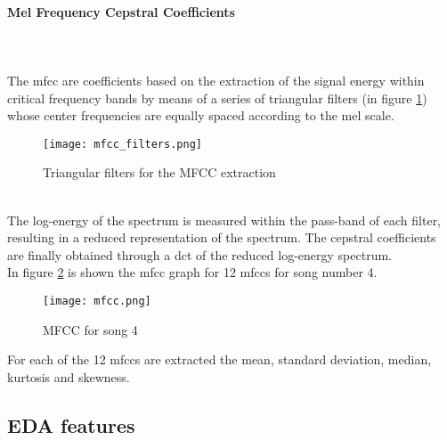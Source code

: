 \paragraph{Mel Frequency Cepstral Coefficients}
\mbox{} \\ \\
The \gls{mfcc} are coefficients based on the extraction of the signal energy within critical frequency bands by means of a series of triangular filters (in figure \ref{fig:mfcc_filters}) whose center frequencies are equally spaced according to the mel scale.
\begin{figure}[h]
    \centering
    \texttt{[image: mfcc\_filters.png]} 
	\caption{Triangular filters for the MFCC extraction}
    \label{fig:mfcc_filters}
\end{figure}
\\
The log-energy of the spectrum is measured within the pass-band of each filter, resulting in a reduced representation of the spectrum. The cepstral coefficients are finally obtained through a \gls{dct} of the reduced log-energy spectrum.
\\
In figure \ref{fig:mfcc} is shown the \gls{mfcc} graph for 12 mfccs for song number 4.
\begin{figure}[h]
    \centering
    \texttt{[image: mfcc.png]} 
	\caption{MFCC for song 4}
    \label{fig:mfcc}
\end{figure}
For each of the 12 mfccs are extracted the mean, standard deviation, median, kurtosis and skewness.

\subsection{EDA features}